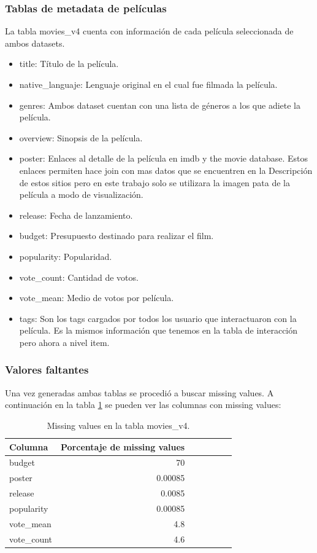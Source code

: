 \documentclass[11pt,a4paper,twoside]{thesis}
\begin{document}
\clearpage
\subsubsection*{Tablas de metadata de películas}

La tabla movies\_v4 cuenta con información de cada película seleccionada de ambos datasets. 

\begin{itemize}
	\item title: 	Título de la película.
	\item native\_languaje: Lenguaje original en el cual fue filmada la película.
	\item genres:  	Ambos dataset cuentan con una lista de géneros a los que adiete la película.
	\item overview:	Sinopsis de la película.
	\item poster:	Enlaces al detalle de la película en imdb y the movie database. Estos enlaces
					permiten hace join con mas datos que se encuentren en la Descripción de estos
			 		sitios pero en este trabajo solo se utilizara la imagen pata de la película
					a modo de visualización.
	\item release: 		Fecha de lanzamiento.
	\item budget: 		Presupuesto destinado para realizar el film.
	\item popularity: 	Popularidad.
	\item vote\_count: 	Cantidad de votos.
	\item vote\_mean: 	Medio de votos por película.
	\item tags:         Son los tags cargados por todos los usuario que interactuaron con la película. 
						Es la mismos información que tenemos en la tabla de interacción pero ahora a nivel item.
\end{itemize}

\subsubsection*{Valores faltantes}

Una vez generadas ambas tablas se procedió a buscar missing values. A continuación en la tabla \ref{table:tab} 
se pueden ver las columnas con missing values:
\begin{table}[h!]
\centering
\footnotesize
\begin{tabular}{lrrrrrr}
\hline
Columna &  Porcentaje de missing values \\
\hline
   	budget     &  70      \\
   	poster     &  0.00085 \\
   	release    &  0.0085  \\
	popularity &  0.00085 \\
	vote\_mean  &  4.8     \\
	vote\_count &  4.6     \\
\hline
\end{tabular}
\caption{Missing values en la tabla movies\_v4.}
\label{table:tab}
\end{table}
\end{document}

